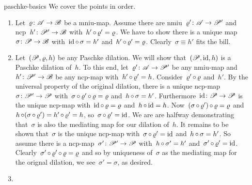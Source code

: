 \documentclass[b5page]{book}
\begin{document}
\begin{solution}{paschke-basics}%
We cover the points in order.
\begin{enumerate}
\item
Let~$\varrho \colon \mathscr{A} \to \mathscr{B}$ be a mniu-map.
Assume there are nmiu~$\varrho'\colon \mathscr{A} \to \mathscr{P}'$
    and ncp~$h'\colon \mathscr{P}' \to \mathscr{B}$
        with~$h' \mathop{\circ} \varrho' = \varrho$.
We have to show there is a unique map~$\sigma\colon \mathscr{P} \to \mathscr{B}$
    with~$\mathrm{id} \mathop{\circ} \sigma= h'$ and~$h' \mathop{\circ} \varrho' = \varrho$.
        Clearly~$\sigma\equiv h' $ fits the bill.

\item
Let~$(\mathscr{P},\varrho,h)$ be any Paschke dilation.
        We will show that~$(\mathscr{P}, \mathrm{id}, h)$ is a Paschke dilation of~$h$.
To this end, let~$\varrho'\colon \mathscr{A} \to \mathscr{P}'$
        be any nmiu-map and~$h'\colon \mathscr{P}' \to \mathscr{B}$
        be any ncp-map with~$h' \mathop{\circ} \varrho' = h$.
Consider~$\varrho' \mathop{\circ} \varrho$ and~$h'$.
    By the universal property of the original dilation,
            there is a unique ncp-map~$\sigma \colon \mathscr{P}' \to \mathscr{P}$
                with~$\sigma\mathop{\circ}\varrho'\mathop{\circ}\varrho = \varrho$
                and~$h \mathop{\circ}\sigma = h'$.
Furthermore~$\mathrm{id}\colon \mathscr{P} \to \mathscr{P}$
    is the unique ncp-map
        with~$\mathrm{id} \mathop{\circ} \varrho = \varrho$
        and~$h \mathop{\circ} \mathrm{id} = h$.
Now~$(\sigma \mathop{\circ} \varrho') \mathop{\circ} \varrho = \varrho$
    and~$h \mathop{\circ} (\sigma \mathop{\circ} \varrho') = h' \mathop{\circ} \varrho' = h$,
        so~$\sigma \mathop{\circ} \varrho' = \mathrm{id}$.
We are are halfway demonstrating that~$\sigma$ is also the mediating map
        for our dilation of~$h$.
It remains to be shown that~$\sigma$ is the unique ncp-map
    with~$\sigma \mathop{\circ} \varrho' = \mathrm{id}$
        and~$h \mathop{\circ} \sigma = h'$.
So assume there is a ncp-map~$\sigma'\colon \mathscr{P}' \to \mathscr{P}$
    with~$h \mathop{\circ} \sigma' = h'$ and~$\sigma' \mathop{\circ} \varrho' = \mathrm{id}$.
    Clearly~$\sigma' \mathop{\circ}\varrho' \mathop{\circ}\varrho =\varrho$
        and so by uniqueness of~$\sigma$ as the mediating map
        for the orignal dilation,
        we see~$\sigma' = \sigma$, as desired.
    \item


\end{enumerate}
\end{solution}
\end{document}
